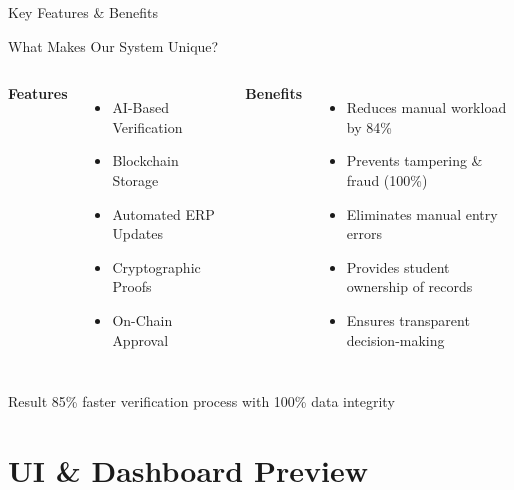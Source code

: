 \documentclass{beamer}
\begin{document}
\begin{frame}{Key Features \& Benefits}
\begin{block}{What Makes Our System Unique?}
\end{block}

\begin{columns}
\textbf{Features}
\begin{itemize}
    \item AI-Based Verification
    \item Blockchain Storage
    \item Automated ERP Updates
    \item Cryptographic Proofs
    \item On-Chain Approval
\end{itemize}

\textbf{Benefits}
\begin{itemize}
    \item Reduces manual workload by 84\%
    \item Prevents tampering \& fraud (100\%)
    \item Eliminates manual entry errors
    \item Provides student ownership of records
    \item Ensures transparent decision-making
\end{itemize}
\end{columns}

\begin{alertblock}{Result}
85\% faster verification process with 100\% data integrity
\end{alertblock}
\end{frame}

\section{UI \& Dashboard Preview}
\end{document}
